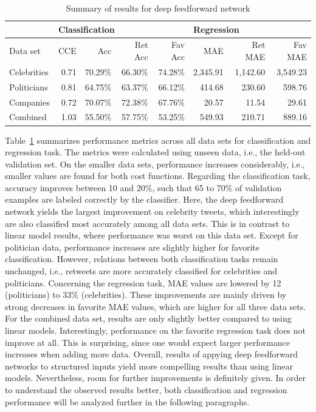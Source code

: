 \begin{table}
  \begin{tabular}{lrrrrrrr}
    \toprule
    & \multicolumn{4}{l}{Classification} & \multicolumn{3}{l}{Regression} \\
    \midrule
    Data set & CCE & Acc & Ret Acc & Fav Acc & MAE & Ret MAE & Fav MAE \\
    \midrule
    Celebrities & 0.71 & 70.29\% & 66.30\% & 74.28\% & 2,345.91 & 1,142.60 & 3,549.23 \\
    Politicians & 0.81 & 64.75\% & 63.37\% & 66.12\% & 414.68 & 230.60 & 598.76 \\
    Companies & 0.72 & 70.07\% & 72.38\% & 67.76\% & 20.57 & 11.54 & 29.61 \\
    Combined & 1.03 & 55.50\% & 57.75\% & 53.25\% & 549.93 & 210.71 & 889.16 \\
    \bottomrule
  \end{tabular}
  \caption{Summary of results for deep feedforward network}
  \label{tab:deep1_results}
\end{table}

Table~\ref{tab:deep1_results} summarizes performance metrics across all data
sets for classification and regression task.
The metrics were calculated using unseen data, i.e., the held-out validation
set.
On the smaller data sets, performance increases considerably, i.e.,
smaller values are found for both cost functions.
Regarding the classification task, accuracy improves between 10 and 20\%, such
that 65 to 70\% of validation examples are labeled correctly by the classifier.
Here, the deep feedforward network yields the largest improvement on celebrity
tweets, which interestingly are also classified most accurately among all data sets.
This is in contrast to linear model results, where performance was worst on this
data set.
Except for politician data, performance increases are slightly higher for favorite
classification.
However, relations between both classification tasks remain unchanged, i.e.,
retweets are more accurately classified for celebrities and politicians.
Concerning the regression task, MAE values are lowered by 12 (politicians) to
33\% (celebrities).
These improvements are mainly driven by strong decreases in favorite MAE values,
which are higher for all three data sets.
For the combined data set, results are only slightly better compared to using
linear models.
Interestingly, performance on the favorite regression task does not improve
at all.
This is surprising, since one would expect larger performance increases when
adding more data.
Overall, results of appying deep feedforward networks to structured inputs
yield more compelling results than using linear models.
Nevertheless, room for further improvements is definitely given.
In order to understand the observed results better, both classification and 
regression performance will be analyzed further in the following paragraphs.

